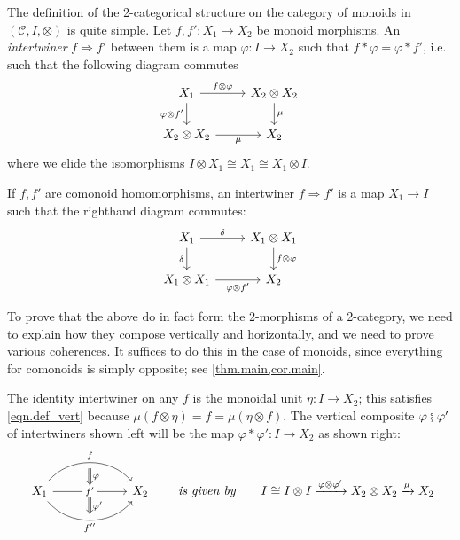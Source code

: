 \documentclass[11pt, one side, article]{memoir}
\theoremstyle{definition}
\theoremstyle{plain}
\newenvironment{definition}
  {\pushQED{\qed}\renewcommand{\qedsymbol}{$\lozenge$}\definitionx}
  {\popQED\enddefinitionx}
\newcommand{\cat}[1]{\mathcal{#1}}%
\newcommand{\then}{\mathbin{\fatsemi}}
\newcommand{\To}[2][]{\xrightarrow[#1]{#2}}
\newcommand{\imp}{\Rightarrow}
\newcommand{\tn}[1]{\textnormal{#1}}
\newcommand{\0}{\textsf{0}}
\newcommand{\1}{\tn{\textsf{1}}}
\newcommand{\hh}[2][]{#1 \tn{\textit{#2}} #1}
\newcommand{\qqby}{\hh[\qquad]{is given by}}
\begin{document}
The definition of the 2-categorical structure on the category of monoids in $(\cat{C},I,\otimes)$ is quite simple.
\begin{definition}
Let $f,f'\colon X_1\to X_2$ be monoid morphisms. An \emph{intertwiner} $f\imp f'$ between them is a map $\varphi\colon I\to X_2$ such that  $f*\varphi=\varphi*f'$, i.e. such that the following diagram commutes
\begin{equation}\label{eqn.inter_monoid}
\begin{tikzcd}
	X_1\ar[r, "f\otimes \varphi"]\ar[d, "\varphi\otimes f'"']&
	X_2\otimes X_2\ar[d, "\mu"]\\
	X_2\otimes X_2\ar[r, "\mu"']&
	X_2
\end{tikzcd}
\end{equation}
where we elide the isomorphisms $I\otimes X_1\cong X_1\cong X_1\otimes I$.
\end{definition}

If $f,f'$ are comonoid homomorphisms, an intertwiner $f\imp f'$ is a map $X_1\to I$ such that the righthand diagram commutes:
\begin{equation}\label{eqn.inter_comonoid}
\begin{tikzcd}
	X_1\ar[r, "\delta"]\ar[d, "\delta"']&
	X_1\otimes X_1\ar[d, "f\otimes\varphi"]\\
	X_1\otimes X_1\ar[r, "\varphi\otimes f'"']&
	X_2
\end{tikzcd}
\end{equation}

To prove that the above do in fact form the 2-morphisms of a 2-category, we need to explain how they compose vertically and horizontally, and we need to prove various coherences. It suffices to do this in the case of monoids, since everything for comonoids is simply opposite; see \cref{thm.main,cor.main}.

The identity intertwiner on any $f$ is the monoidal unit $\eta\colon I\to X_2$; this satisfies \eqref{eqn.def_vert} because $\mu(f\otimes\eta)=f=\mu(\eta\otimes f)$. The vertical composite $\varphi\then\varphi'$ of intertwiners shown left will be the map $\varphi*\varphi'\colon I\to X_2$ as shown right:
\begin{equation}\label{eqn.def_vert}
\begin{tikzcd}[column sep=60pt]
	X_1\ar[r, bend left=50pt, "f", ""' name=a]\ar[r, "f'" description, "" name=b1, ""' name=b2]\ar[r, bend right=50pt, "f''"', "" name=c]&
	X_2
	\ar[from=a, to=b1, Rightarrow, "\varphi"]
	\ar[from=b2, to=c, Rightarrow, "\varphi'"]
\end{tikzcd}
\qqby
	I\cong I\otimes I\To{\varphi\otimes\varphi'}X_2\otimes X_2\To{\mu}X_2
\end{equation}
\end{document}

